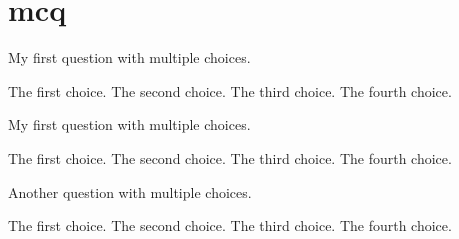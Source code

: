 \documentclass{exam}
\begin{document}
\section*{mcq}
\begin{questions}
	\question My first question with multiple choices.
	\begin{choices}
		\choice The first choice.
		\choice The second choice.
		\choice The third choice.
		\choice The fourth choice.
	\end{choices}


	\question My first question with multiple choices.
	\begin{checkboxes}
		\choice The first choice.
		\choice The second choice.
		\choice The third choice.
		\choice The fourth choice.
	\end{checkboxes}

	\question Another question with multiple choices.\\
	\begin{oneparcheckboxes}
		\choice The first choice.
		\choice The second choice.
		\choice The third choice.
		\choice The fourth choice.
	\end{oneparcheckboxes}

\end{questions}
\end{document}
